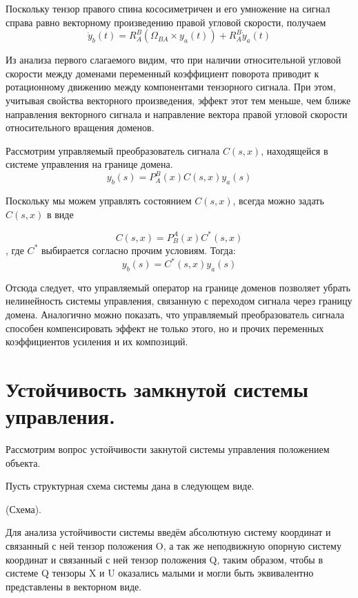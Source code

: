 \documentclass[a4paper]{article}
\begin{document}
Поскольку тензор правого спина кососиметричен и его умножение на сигнал справа равно векторному произведению правой угловой скорости, получаем
\begin{equation} \dot{y}_b(t) = R_A^B (\Omega_{BA} \times y_a(t)) + R_A^B \dot{y}_a(t)\end{equation}

Из анализа первого слагаемого видим, что при наличии относительной угловой скорости между доменами переменный коэффициент поворота приводит к ротационному движению между компонентами тензорного сигнала. При этом, учитывая свойства векторного произведения, эффект этот тем меньше, чем ближе направления векторного сигнала и направление вектора правой угловой скорости относительного вращения доменов.  

Рассмотрим управляемый преобразователь сигнала $C(s,x)$, находящейся в системе управления на границе домена.
\begin{equation} y_b(s) = P_A^B(x) C(s,x) y_a(s) \end{equation}

Поскольку мы можем управлять состоянием $C(s,x)$, всегда можно задать $C(s,x)$ в виде

\begin{equation} C(s,x) = P_B^A(x) C^*(s,x) \end{equation}
, где $C^*$ выбирается согласно прочим условиям. Тогда:
\begin{equation} y_b(s) = C^*(s,x) y_a(s) \end{equation} 

Отсюда следует, что управляемый оператор на границе доменов позволяет убрать нелинейность системы управления, связанную с переходом сигнала через границу домена. Аналогично можно показать, что управляемый преобразователь сигнала способен компенсировать эффект не только этого, но и прочих переменных коэффициентов усиления и их композиций.

\section{Устойчивость замкнутой системы управления.}
Рассмотрим вопрос устойчивости закнутой системы управления положением объекта.

Пусть структурная схема системы дана в следующем виде.

(Схема).

Для анализа устойчивости системы введём абсолютную систему координат и связанный с ней тензор положения O, а так же неподвижную опорную систему координат и связанный с ней тензор положения Q, таким образом, чтобы в системе Q тензоры X и U оказались малыми и могли быть эквивалентно представлены в векторном виде.
\end{document}
